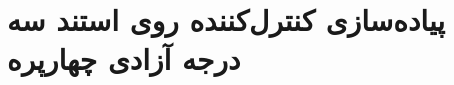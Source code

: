 \documentclass{CCI2020}
\begin{document}
	
	
	
	
	
	
	\section{پیاده‌سازی کنترل‌کننده روی استند سه درجه آزادی چهارپره}
	
	
\end{document}
